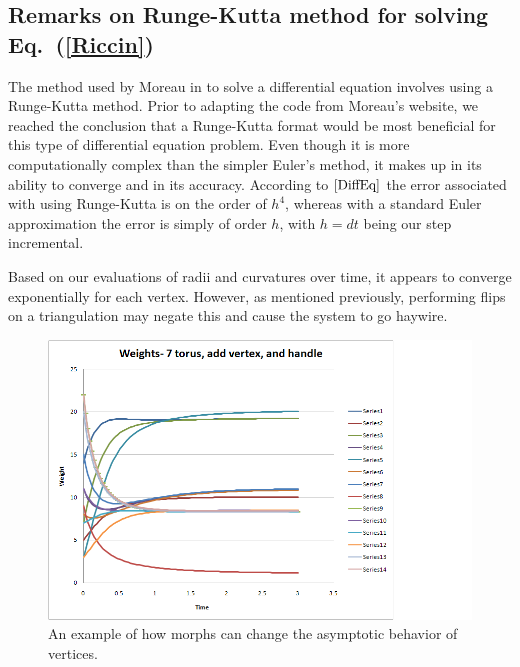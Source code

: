 \documentclass[12pt]{article}
\begin{document}
  \subsection{Remarks on Runge-Kutta method for solving Eq.~(\ref{Riccin})}
	\maketitle

The method used by Moreau in \cite{JPM} to solve a differential equation involves using a Runge-Kutta method. Prior to adapting the code from Moreau's website, we reached the conclusion that a Runge-Kutta format would be most beneficial for this type of differential equation problem. Even though it is more computationally complex than the simpler Euler's method, it makes up in its ability to converge and in its accuracy. According to $\cite{DiffEq}$ the error associated with using Runge-Kutta is on the order of $h^4$, whereas with a standard Euler approximation the error is simply of order $h$, with $h = dt$ being our step incremental.\newline

\noindent Based on our evaluations of radii and curvatures over time, it appears to converge exponentially for each vertex. However, as mentioned previously, performing flips on a triangulation may negate this and cause the system to go haywire. 

\begin{figure}[ht]
\centering
\includegraphics[scale = 0.8]{torus7addvaddhweights.png}
\caption{An example of how morphs can change the asymptotic behavior of vertices.}
\label{fig:t7vh}
\end{figure}
\end{document}
